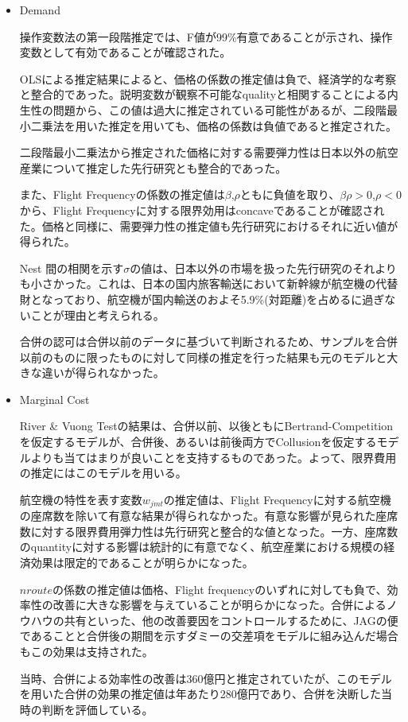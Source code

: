\documentclass{jsarticle}
\begin{document}
\begin{enumerate}
\begin{itemize}
 \item Demand
 
 操作変数法の第一段階推定では、F値が99\%有意であることが示され、操作変数として有効であることが確認された。
 
 OLSによる推定結果によると、価格の係数の推定値は負で、経済学的な考察と整合的であった。説明変数が観察不可能なqualityと相関することによる内生性の問題から、この値は過大に推定されている可能性があるが、二段階最小二乗法を用いた推定を用いても、価格の係数は負値であると推定された。
 
 二段階最小二乗法から推定された価格に対する需要弾力性は日本以外の航空産業について推定した先行研究とも整合的であった。
 
 また、Flight Frequencyの係数の推定値は$\beta$,$\rho$ともに負値を取り、$\beta \rho >0$,$\rho<0$から、Flight Frequencyに対する限界効用はconcaveであることが確認された。価格と同様に、需要弾力性の推定値も先行研究におけるそれに近い値が得られた。
 
 Nest 間の相関を示す$\sigma$の値は、日本以外の市場を扱った先行研究のそれよりも小さかった。これは、日本の国内旅客輸送において新幹線が航空機の代替財となっており、航空機が国内輸送のおよそ5.9\%(対距離)を占めるに過ぎないことが理由と考えられる。
 
 合併の認可は合併以前のデータに基づいて判断されるため、サンプルを合併以前のものに限ったものに対して同様の推定を行った結果も元のモデルと大きな違いが得られなかった。
 
 \item Marginal Cost
 
 River \& Vuong Testの結果は、合併以前、以後ともにBertrand-Competitionを仮定するモデルが、合併後、あるいは前後両方でCollusionを仮定するモデルよりも当てはまりが良いことを支持するものであった。よって、限界費用の推定にはこのモデルを用いる。
 
 航空機の特性を表す変数$w_{jmt}$の推定値は、Flight Frequencyに対する航空機の座席数を除いて有意な結果が得られなかった。有意な影響が見られた座席数に対する限界費用弾力性は先行研究と整合的な値となった。一方、座席数のquantityに対する影響は統計的に有意でなく、航空産業における規模の経済効果は限定的であることが明らかになった。
 
 $nroute$の係数の推定値は価格、Flight frequencyのいずれに対しても負で、効率性の改善に大きな影響を与えていることが明らかになった。合併によるノウハウの共有といった、他の改善要因をコントロールするために、JAGの便であることと合併後の期間を示すダミーの交差項をモデルに組み込んだ場合もこの効果は支持された。
 
 当時、合併による効率性の改善は360億円と推定されていたが、このモデルを用いた合併の効果の推定値は年あたり280億円であり、合併を決断した当時の判断を評価している。


\end{itemize}
\end{enumerate}
\end{document}
